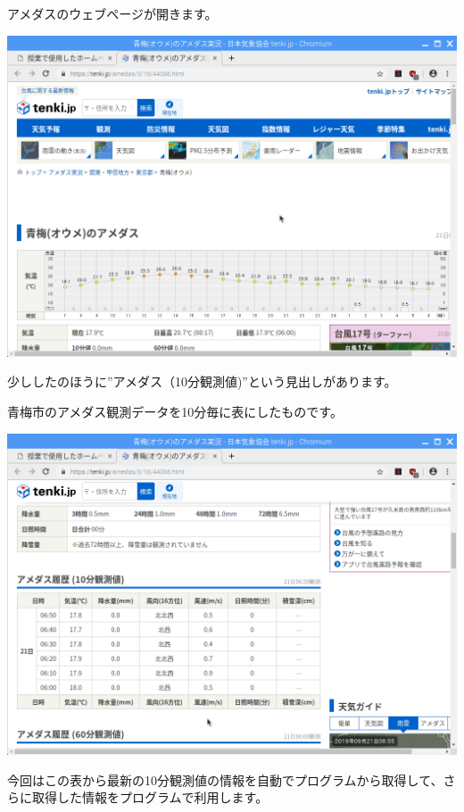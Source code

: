 \documentclass[a4paper,12pt,dvipdfmx]{jarticle}
\begin{document}
\bigskip


\bigskip

アメダスのウェブページが開きます。

\begin{center}
\includegraphics[width=17.006cm]{textbook-img028.png}

\end{center}
\clearpage
少ししたのほうに”アメダス（10分観測値)”という見出しがあります。

青梅市のアメダス観測データを10分毎に表にしたものです。



\begin{center}
\includegraphics[width=17.006cm]{textbook-img029.png}

\end{center}
今回はこの表から最新の10分観測値の情報を自動でプログラムから取得して、さらに取得した情報をプログラムで利用します。
\end{document}
